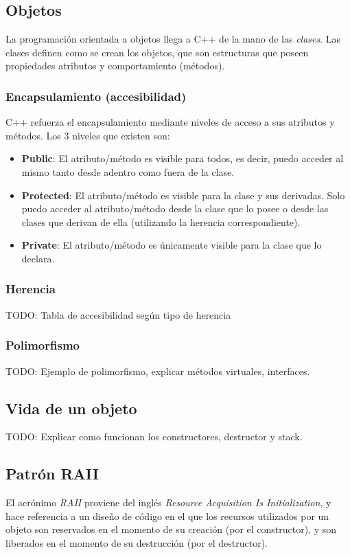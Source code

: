 \documentclass[a4paper, twoside]{article}
\begin{document}
\subsection{Objetos}
La programación orientada a objetos llega a C++ de la mano de las \emph{clases}. Las clases definen como se crean los objetos, que son estructuras que poseen propiedades atributos y comportamiento (métodos).

\subsubsection{Encapsulamiento (accesibilidad)}
C++ refuerza el encapsulamiento mediante niveles de acceso a sus atributos y métodos. Los 3 niveles que existen son:

\begin{itemize}
	\item \textbf{Public}: El atributo/método es visible para todos, es decir, puedo acceder al mismo tanto desde adentro como fuera de la clase.
	\item \textbf{Protected}: El atributo/método es visible para la clase y sus derivadas. Solo puedo acceder al atributo/método desde la clase que lo posee o desde las clases que derivan de ella (utilizando la herencia correspondiente).
	\item \textbf{Private}: El atributo/método es únicamente visible para la clase que lo declara.
	
	
\end{itemize}

\subsubsection{Herencia}
TODO: Tabla de accesibilidad según tipo de herencia %

\subsubsection{Polimorfismo}
TODO: Ejemplo de polimorfismo, explicar métodos virtuales, interfaces. %

\subsection{Vida de un objeto}
TODO: Explicar como funcionan los constructores, destructor y stack.

\subsection{Patrón RAII}
El acrónimo \emph{RAII} proviene del inglés \emph{Resource Acquisition Is Initialization}, y hace referencia a un diseño de código en el que los recursos utilizados por un objeto son reservados en el momento de su creación (por el constructor), y son liberados en el momento de su destrucción (por el destructor).
\end{document}
